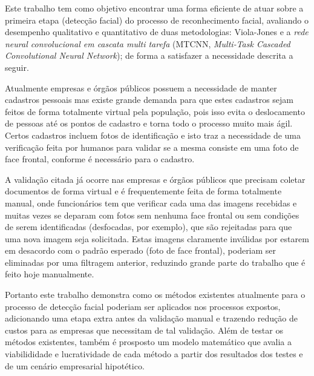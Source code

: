 Este trabalho tem como objetivo encontrar uma forma eficiente de atuar sobre a primeira etapa (detecção facial) do processo de reconhecimento facial, avaliando o desempenho qualitativo e quantitativo de duas metodologias: Viola-Jones e a \textit{rede neural convolucional em cascata multi tarefa} (MTCNN, \textit{Multi-Task Cascaded Convolutional Neural Network}); de forma a satisfazer a necessidade descrita a seguir.

Atualmente empresas e órgãos públicos possuem a necessidade de manter cadastros pessoais mas existe grande demanda para que estes cadastros sejam feitos de forma totalmente virtual pela população, pois isso evita o deslocamento de pessoas até os pontos de cadastro e torna todo o processo muito mais ágil. Certos cadastros incluem fotos de identificação e isto traz a necessidade de uma verificação feita por humanos para validar se a mesma consiste em uma foto de face frontal, conforme é necessário para o cadastro.

A validação citada já ocorre nas empresas e órgãos públicos que precisam coletar documentos de forma virtual e é frequentemente feita de forma totalmente manual, onde funcionários tem que verificar cada uma das imagens recebidas e muitas vezes se deparam com fotos sem nenhuma face frontal ou sem condições de serem identificadas (desfocadas, por exemplo), que são rejeitadas para que uma nova imagem seja solicitada. Estas imagens claramente inválidas por estarem em desacordo com o padrão esperado (foto de face frontal), poderiam ser eliminadas por uma filtragem anterior, reduzindo grande parte do trabalho que é feito hoje manualmente.

Portanto este trabalho demonstra como os métodos existentes atualmente para o processo de detecção facial poderiam ser aplicados nos processos expostos, adicionando uma etapa extra antes da validação manual e trazendo redução de custos para as empresas que necessitam de tal validação. Além de testar os métodos existentes, também é prosposto um modelo matemático que avalia a viabilididade e lucratividade de cada método a partir dos resultados dos testes e de um cenário empresarial hipotético.
